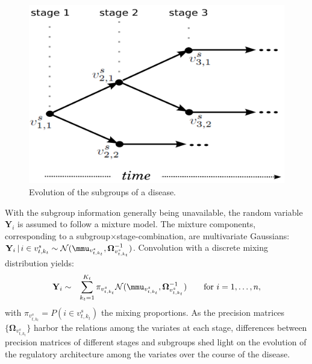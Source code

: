 \documentclass[10pt]{article}
\begin{document}
\begin{figure}[h!]
\begin{center}
\includegraphics[angle=0, scale=0.08]{stages2subgroups.png}
\end{center}
\caption{Evolution of the subgroups of a disease.}
\label{fig.diseaseEvolution}
\end{figure}


With the subgroup information generally being unavailable, the random variable $\mathbf{Y}_i$ is assumed to follow a mixture model. The mixture components, corresponding to a
subgroup$\times$stage-combination, are multivariate Gaussians: $\mathbf{Y}_{i} \, | \, i \in v_{t, k_t}^s \sim \mathcal{N}(\mmu_{v_{t, k_t}^s}, \mathbf{\Omega}_{v_{t, k_t}^s}^{-1})$. Convolution with a discrete mixing distribution yields:
\begin{eqnarray} \label{form:mixtureModel}
\mathbf{Y}_{i} & \sim & \sum_{k_t=1}^{K_t} \pi_{v_{t, k_t}^s} \mathcal{N}(\mmu_{v_{t, k_t}^s}, \mathbf{\Omega}_{v_{t, k_t}^s}^{-1}) \qquad \mbox{for } i=1, \ldots, n,
\end{eqnarray}
with $\pi_{v_{t, k_t}^s} = P(i \in v_{t, k_t}^s )$ the mixing proportions. As the precision matrices $\{ \mathbf{\Omega}_{v_{t, k_t}^s} \}$ harbor the relations among the variates at each stage, differences between precision matrices of different stages and subgroups shed light on the evolution of the regulatory architecture among the variates over the course of the disease.


\end{document}
